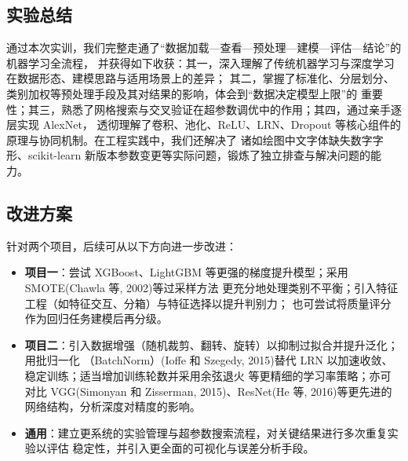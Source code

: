 \documentclass[12pt,a4paper,fontset=fandol]{ctexart}   %
\numberwithin{figure}{section}
\numberwithin{table}{section}
\numberwithin{equation}{section}
\begin{document}
\subsection{实验总结}
通过本次实训，我们完整走通了“数据加载—查看—预处理—建模—评估—结论”的机器学习全流程，
并获得如下收获：其一，深入理解了传统机器学习与深度学习在数据形态、建模思路与适用场景上的差异；
其二，掌握了标准化、分层划分、类别加权等预处理手段及其对结果的影响，体会到“数据决定模型上限”的
重要性；其三，熟悉了网格搜索与交叉验证在超参数调优中的作用；其四，通过亲手逐层实现 AlexNet，
透彻理解了卷积、池化、ReLU、LRN、Dropout 等核心组件的原理与协同机制。在工程实践中，我们还解决了
诸如绘图中文字体缺失数字字形、scikit-learn 新版本参数变更等实际问题，锻炼了独立排查与解决问题的能力。

\subsection{改进方案}
针对两个项目，后续可从以下方向进一步改进：
\begin{itemize}[leftmargin=2.2em]
  \item \textbf{项目一}：尝试 XGBoost、LightGBM 等更强的梯度提升模型；采用 SMOTE(Chawla 等, 2002)等过采样方法
  更充分地处理类别不平衡；引入特征工程（如特征交互、分箱）与特征选择以提升判别力；
  也可尝试将质量评分作为回归任务建模后再分级。
  \item \textbf{项目二}：引入数据增强（随机裁剪、翻转、旋转）以抑制过拟合并提升泛化；用批归一化
  （BatchNorm）(Ioffe 和 Szegedy, 2015)替代 LRN 以加速收敛、稳定训练；适当增加训练轮数并采用余弦退火
  等更精细的学习率策略；亦可对比 VGG(Simonyan 和 Zisserman, 2015)、ResNet(He 等, 2016)等更先进的
  网络结构，分析深度对精度的影响。
  \item \textbf{通用}：建立更系统的实验管理与超参数搜索流程，对关键结果进行多次重复实验以评估
  稳定性，并引入更全面的可视化与误差分析手段。
\end{itemize}

\end{document}
